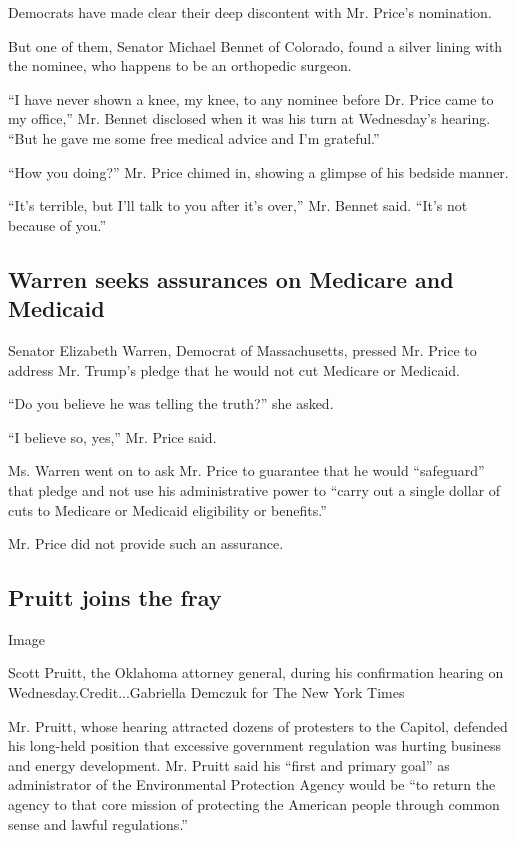 Democrats have made clear their deep discontent with Mr. Price's
nomination.

But one of them, Senator Michael Bennet of Colorado, found a silver
lining with the nominee, who happens to be an orthopedic surgeon.

``I have never shown a knee, my knee, to any nominee before Dr. Price
came to my office,'' Mr. Bennet disclosed when it was his turn at
Wednesday's hearing. ``But he gave me some free medical advice and I'm
grateful.''

``How you doing?'' Mr. Price chimed in, showing a glimpse of his bedside
manner.

``It's terrible, but I'll talk to you after it's over,'' Mr. Bennet
said. ``It's not because of you.''

\hypertarget{warren-seeks-assurances-on-medicare-and-medicaid}{%
\subsection{Warren seeks assurances on Medicare and
Medicaid}\label{warren-seeks-assurances-on-medicare-and-medicaid}}

Senator Elizabeth Warren, Democrat of Massachusetts, pressed Mr. Price
to address Mr. Trump's pledge that he would not cut Medicare or
Medicaid.

``Do you believe he was telling the truth?'' she asked.

``I believe so, yes,'' Mr. Price said.

Ms. Warren went on to ask Mr. Price to guarantee that he would
``safeguard'' that pledge and not use his administrative power to
``carry out a single dollar of cuts to Medicare or Medicaid eligibility
or benefits.''

Mr. Price did not provide such an assurance.

\hypertarget{pruitt-joins-the-fray}{%
\subsection{Pruitt joins the fray}\label{pruitt-joins-the-fray}}

Image

Scott Pruitt, the Oklahoma attorney general, during his confirmation
hearing on Wednesday.Credit...Gabriella Demczuk for The New York Times

Mr. Pruitt, whose hearing attracted dozens of protesters to the Capitol,
defended his long-held position that excessive government regulation was
hurting business and energy development. Mr. Pruitt said his ``first and
primary goal'' as administrator of the Environmental Protection Agency
would be ``to return the agency to that core mission of protecting the
American people through common sense and lawful regulations.''

